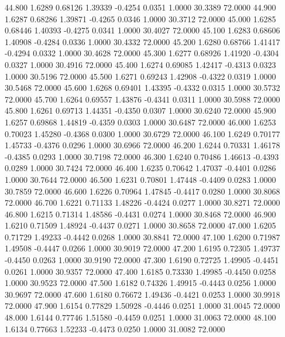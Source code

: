   44.800   1.6289   0.68126   1.39339  -0.4254   0.0351   1.0000  30.3389  72.0000
  44.900   1.6287   0.68286   1.39871  -0.4265   0.0346   1.0000  30.3712  72.0000
  45.000   1.6285   0.68446   1.40393  -0.4275   0.0341   1.0000  30.4027  72.0000
  45.100   1.6283   0.68606   1.40908  -0.4284   0.0336   1.0000  30.4332  72.0000
  45.200   1.6280   0.68766   1.41417  -0.4294   0.0332   1.0000  30.4628  72.0000
  45.300   1.6277   0.68926   1.41920  -0.4304   0.0327   1.0000  30.4916  72.0000
  45.400   1.6274   0.69085   1.42417  -0.4313   0.0323   1.0000  30.5196  72.0000
  45.500   1.6271   0.69243   1.42908  -0.4322   0.0319   1.0000  30.5468  72.0000
  45.600   1.6268   0.69401   1.43395  -0.4332   0.0315   1.0000  30.5732  72.0000
  45.700   1.6264   0.69557   1.43876  -0.4341   0.0311   1.0000  30.5988  72.0000
  45.800   1.6261   0.69713   1.44351  -0.4350   0.0307   1.0000  30.6240  72.0000
  45.900   1.6257   0.69868   1.44819  -0.4359   0.0303   1.0000  30.6487  72.0000
  46.000   1.6253   0.70023   1.45280  -0.4368   0.0300   1.0000  30.6729  72.0000
  46.100   1.6249   0.70177   1.45733  -0.4376   0.0296   1.0000  30.6966  72.0000
  46.200   1.6244   0.70331   1.46178  -0.4385   0.0293   1.0000  30.7198  72.0000
  46.300   1.6240   0.70486   1.46613  -0.4393   0.0289   1.0000  30.7424  72.0000
  46.400   1.6235   0.70642   1.47037  -0.4401   0.0286   1.0000  30.7644  72.0000
  46.500   1.6231   0.70801   1.47448  -0.4409   0.0283   1.0000  30.7859  72.0000
  46.600   1.6226   0.70964   1.47845  -0.4417   0.0280   1.0000  30.8068  72.0000
  46.700   1.6221   0.71133   1.48226  -0.4424   0.0277   1.0000  30.8271  72.0000
  46.800   1.6215   0.71314   1.48586  -0.4431   0.0274   1.0000  30.8468  72.0000
  46.900   1.6210   0.71509   1.48924  -0.4437   0.0271   1.0000  30.8658  72.0000
  47.000   1.6205   0.71729   1.49233  -0.4442   0.0268   1.0000  30.8841  72.0000
  47.100   1.6200   0.71987   1.49508  -0.4447   0.0266   1.0000  30.9019  72.0000
  47.200   1.6195   0.72305   1.49737  -0.4450   0.0263   1.0000  30.9190  72.0000
  47.300   1.6190   0.72725   1.49905  -0.4451   0.0261   1.0000  30.9357  72.0000
  47.400   1.6185   0.73330   1.49985  -0.4450   0.0258   1.0000  30.9523  72.0000
  47.500   1.6182   0.74326   1.49915  -0.4443   0.0256   1.0000  30.9697  72.0000
  47.600   1.6180   0.76672   1.49436  -0.4421   0.0253   1.0000  30.9918  72.0000
  47.900   1.6154   0.77829   1.50928  -0.4446   0.0251   1.0000  31.0045  72.0000
  48.000   1.6144   0.77746   1.51580  -0.4459   0.0251   1.0000  31.0063  72.0000
  48.100   1.6134   0.77663   1.52233  -0.4473   0.0250   1.0000  31.0082  72.0000
